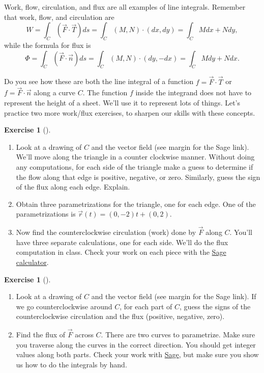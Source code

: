\documentclass[10pt,]{book}
\theoremstyle{plain}
\theoremstyle{definition}
\theoremstyle{definition}
\theoremstyle{definition}
\theoremstyle{definition}
\newtheorem{exploration}[project]{Exercise}
\theoremstyle{definition}
\numberwithin{equation}{section}
\newcommand{\sageworkfluxurl}{http://bmw.byuimath.com/dokuwiki/doku.php?id=both_flux_and_work}
\begin{document}
Work, flow, circulation, and flux are all examples of line integrals. Remember that work, flow, and circulation are%
\begin{equation*}
W=\int_C (\vec F\cdot \vec T)ds =\int_C (M,N)\cdot(dx,dy) =  \int_C Mdx+Ndy,
\end{equation*}
while the formula for flux is%
\begin{equation*}
\Phi=\int_C (\vec F\cdot \vec n)ds =\int_C (M,N)\cdot(dy,-dx) =  \int_C Mdy+Ndx.
\end{equation*}
%
\par
Do you see how these are both the line integral of a function \(f = \vec F\cdot \vec T\) or \(f=\vec F\cdot \vec n\) along a curve \(C\). The function \(f\) inside the integrand does not have to represent the height of a sheet. We'll use it to represent lots of things. Let's practice two more work/flux exercises, to sharpen our skills with these concepts.%
\begin{exploration}[]\label{exploration-201}
\leavevmode%
\begin{enumerate}[font=\bfseries,label=(\alph*),ref=\alph*]
\item\label{task-508} Look at a drawing of \(C\) and the vector field (see margin for the Sage link).  We'll move along the triangle in a counter clockwise manner. Without doing any computations, for each side of the triangle make a guess to determine if the flow along that edge is positive, negative, or zero. Similarly, guess the sign of the flux along each edge.  Explain.%
\item\label{task-509} Obtain three parametrizations for the triangle, one for each edge.  One of the parametrizations is \(\vec r(t) = (0,-2)t+(0,2)\).%
\item\label{task-510} Now find the counterclockwise circulation (work) done by \(\vec F\) along \(C\).  You'll have three separate calculations, one for each side. We'll do the flux computation in class. Check your work on each piece with the \href{\\sageworkfluxurl}{Sage calculator}.%
\end{enumerate}
\end{exploration}
\begin{exploration}[]\label{exploration-202}
\leavevmode%
\begin{enumerate}[font=\bfseries,label=(\alph*),ref=\alph*]
\item\label{task-511} Look at a drawing of \(C\) and the vector field (see margin for the Sage link).  If we go counterclockwise around \(C\), for each part of \(C\), guess the signs of the counterclockwise circulation and the flux (positive, negative, zero).%
\item\label{task-512} Find the flux of \(\vec F\) across \(C\).  There are two curves to parametrize. Make sure you traverse along the curves in the correct direction. You should get integer values along both parts. Check your work with \href{\\sageworkfluxurl}{Sage}, but make sure you show us how to do the integrals by hand.%
%
\end{enumerate}
\end{exploration}
\end{document}
